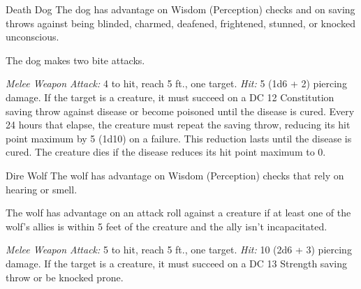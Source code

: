 \documentclass[10pt,a4paper,twoside,bg=print,twocolumn,openany,nodeprecatedcode]{dndbook}
\begin{document}
\begin{DndMonster}[float=t]{Death Dog}
\DndMonsterBasics[
armor-class = {12},
hit-points = {\DndDice{6d8 + 12}},
speed = {40 ft.}
]
\DndMonsterAbilityScores[
 str = 15,
 dex = 14,
 con = 14,
 int = 3,
 wis = 13,
 cha = 6
]
\DndMonsterDetails[
skills = {Perception +5, Stealth +4},
senses = {darkvision 120 ft., passive perception 15},
challenge = 1,
]
The dog has advantage on Wisdom (Perception) checks and on saving throws against being blinded, charmed, deafened, frightened, stunned, or knocked unconscious.

The dog makes two bite attacks.

\textsl{Melee Weapon Attack:} 4 to hit, reach 5 ft., one target. \textsl{Hit:} 5 (1d6 + 2) piercing damage. If the target is a creature, it must succeed on a DC 12 Constitution saving throw against disease or become poisoned until the disease is cured. Every 24 hours that elapse, the creature must repeat the saving throw, reducing its hit point maximum by 5 (1d10) on a failure. This reduction lasts until the disease is cured. The creature dies if the disease reduces its hit point maximum to 0.

\end{DndMonster}



\begin{DndMonster}[float=t]{Dire Wolf}
\DndMonsterBasics[
armor-class = {14 (natural armor)},
hit-points = {\DndDice{5d10 + 10}},
speed = {50 ft.}
]
\DndMonsterAbilityScores[
 str = 17,
 dex = 15,
 con = 15,
 int = 3,
 wis = 12,
 cha = 7
]
\DndMonsterDetails[
skills = {Perception +3, Stealth +4},
challenge = 1,
]
The wolf has advantage on Wisdom (Perception) checks that rely on hearing or smell.

The wolf has advantage on an attack roll against a creature if at least one of the wolf's allies is within 5 feet of the creature and the ally isn't incapacitated.

\textsl{Melee Weapon Attack:} 5 to hit, reach 5 ft., one target. \textsl{Hit:} 10 (2d6 + 3) piercing damage. If the target is a creature, it must succeed on a DC 13 Strength saving throw or be knocked prone.

\end{DndMonster}
\end{document}
